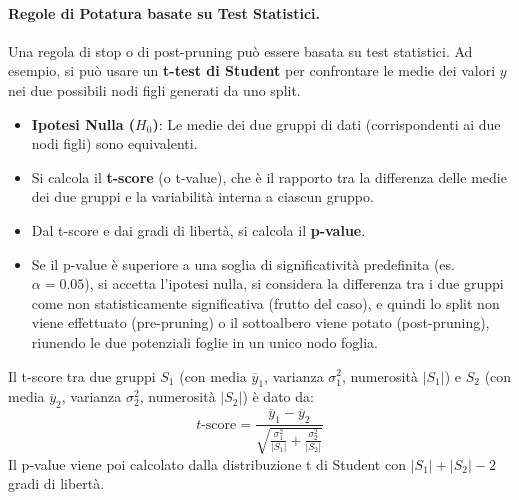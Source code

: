 \documentclass{article}
\begin{document}
\paragraph{Regole di Potatura basate su Test Statistici.}
Una regola di stop o di post-pruning può essere basata su test statistici. Ad esempio, si può usare un \textbf{t-test di Student} per confrontare le medie dei valori $y$ nei due possibili nodi figli generati da uno split.
\begin{itemize}
    \item \textbf{Ipotesi Nulla ($H_0$)}: Le medie dei due gruppi di dati (corrispondenti ai due nodi figli) sono equivalenti.
    \item Si calcola il \textbf{t-score} (o t-value), che è il rapporto tra la differenza delle medie dei due gruppi e la variabilità interna a ciascun gruppo.
    \item Dal t-score e dai gradi di libertà, si calcola il \textbf{p-value}.
    \item Se il p-value è superiore a una soglia di significatività predefinita (es. $\alpha = 0.05$), si accetta l'ipotesi nulla, si considera la differenza tra i due gruppi come non statisticamente significativa (frutto del caso), e quindi lo split non viene effettuato (pre-pruning) o il sottoalbero viene potato (post-pruning), riunendo le due potenziali foglie in un unico nodo foglia.
\end{itemize}
Il t-score tra due gruppi $S_1$ (con media $\overline{y}_1$, varianza $\sigma_1^2$, numerosità $|S_1|$) e $S_2$ (con media $\overline{y}_2$, varianza $\sigma_2^2$, numerosità $|S_2|$) è dato da:
$$ t\text{-score} = \frac{\overline{y}_1 - \overline{y}_2}{\sqrt{\frac{\sigma_1^2}{|S_1|} + \frac{\sigma_2^2}{|S_2|}}} $$
Il p-value viene poi calcolato dalla distribuzione t di Student con $|S_1| + |S_2| - 2$ gradi di libertà.
\end{document}
